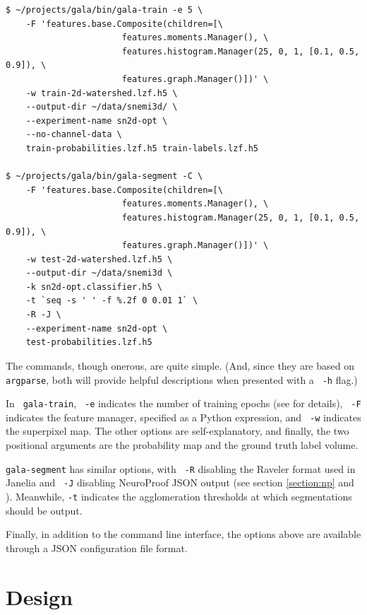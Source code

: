 \documentclass{frontiersSCNS} %
\begin{document}
{\small
\begin{verbatim}
$ ~/projects/gala/bin/gala-train -e 5 \
    -F 'features.base.Composite(children=[\
                       features.moments.Manager(), \
                       features.histogram.Manager(25, 0, 1, [0.1, 0.5, 0.9]), \
                       features.graph.Manager()])' \
    -w train-2d-watershed.lzf.h5 \
    --output-dir ~/data/snemi3d/ \
    --experiment-name sn2d-opt \
    --no-channel-data \
    train-probabilities.lzf.h5 train-labels.lzf.h5 

$ ~/projects/gala/bin/gala-segment -C \
    -F 'features.base.Composite(children=[\
                       features.moments.Manager(), \
                       features.histogram.Manager(25, 0, 1, [0.1, 0.5, 0.9]), \
                       features.graph.Manager()])' \
    -w test-2d-watershed.lzf.h5 \
    --output-dir ~/data/snemi3d \
    -k sn2d-opt.classifier.h5 \
    -t `seq -s ' ' -f %.2f 0 0.01 1` \
    -R -J \
    --experiment-name sn2d-opt \
    test-probabilities.lzf.h5
\end{verbatim}
}

The commands, though onerous, are quite simple.
(And, since they are based on \texttt{ \small argparse}, both will provide helpful descriptions when presented with a \texttt{ \small -h} flag.)

In \texttt{ \small gala-train}, \texttt{ \small -e} indicates the number of training epochs (see \cite{NunezIglesias:2013cd} for details), \texttt{ \small -F} indicates the feature manager, specified as a Python expression, and \texttt{ \small -w} indicates the superpixel map.
The other options are self-explanatory, and finally, the two positional arguments are the probability map and the ground truth label volume.

\texttt{\small gala-segment} has similar options, with \texttt{ \small -R} disabling the Raveler format \citep{raveler} used in Janelia and \texttt{ \small -J} disabling NeuroProof JSON output (see section \ref{section:np} and \cite{np}).
Meanwhile, \texttt{\small -t} indicates the agglomeration thresholds at which segmentations should be output.

Finally, in addition to the command line interface, the options above are available through a JSON configuration file format.


\section{Design}
\end{document}
